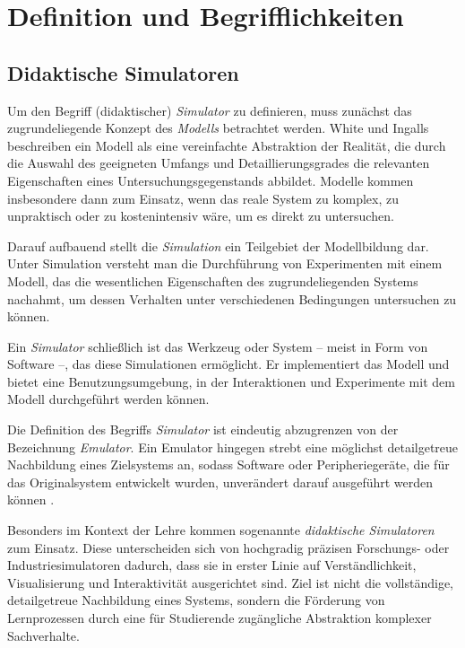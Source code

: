 \section{Definition und Begrifflichkeiten}

\subsection{Didaktische Simulatoren}
Um den Begriff (didaktischer) \textit{Simulator} zu definieren, muss zunächst das zugrundeliegende Konzept des \textit{Modells} betrachtet werden. White und Ingalls beschreiben ein Modell als eine vereinfachte Abstraktion der Realität, die durch die Auswahl des geeigneten Umfangs und Detaillierungsgrades die relevanten Eigenschaften eines Untersuchungsgegenstands abbildet. Modelle kommen insbesondere dann zum Einsatz, wenn das reale System zu komplex, zu unpraktisch oder zu kostenintensiv wäre, um es direkt zu untersuchen.\parencite[S.~12]{white_introduction_2009}\parencite[S.~5]{banks_what_2008}

Darauf aufbauend stellt die \textit{Simulation} ein Teilgebiet der Modellbildung dar. Unter Simulation versteht man die Durchführung von Experimenten mit einem Modell, das die wesentlichen Eigenschaften des zugrundeliegenden Systems nachahmt, um dessen Verhalten unter verschiedenen Bedingungen untersuchen zu können.\parencite[S.~12]{white_introduction_2009}\parencite[S.~6]{banks_what_2008}

Ein \textit{Simulator} schließlich ist das Werkzeug oder System -- meist in Form von Software --, das diese Simulationen ermöglicht. Er implementiert das Modell und bietet eine Benutzungsumgebung, in der Interaktionen und Experimente mit dem Modell durchgeführt werden können.\parencite[S.~304f]{duran_what_2020}

Die Definition des Begriffs \textit{Simulator} ist eindeutig abzugrenzen von der Bezeichnung \textit{Emulator}. Ein Emulator hingegen strebt eine möglichst detailgetreue Nachbildung eines Zielsystems an, sodass Software oder Peripheriegeräte, die für das Originalsystem entwickelt wurden, unverändert darauf ausgeführt werden können \parencite[S.~1683]{mcgregor_relationship_2002}.

Besonders im Kontext der Lehre kommen sogenannte \textit{didaktische Simulatoren} zum Einsatz. Diese unterscheiden sich von hochgradig präzisen Forschungs- oder Industriesimulatoren dadurch, dass sie in erster Linie auf Verständlichkeit, Visualisierung und Interaktivität ausgerichtet sind. Ziel ist nicht die vollständige, detailgetreue Nachbildung eines Systems, sondern die Förderung von Lernprozessen durch eine für Studierende zugängliche Abstraktion komplexer Sachverhalte.\parencite[S.~256]{muller_entwicklung_2020}\parencite[S.~1]{nystrom_teaching_2024}

